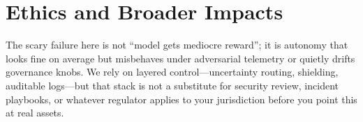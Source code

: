 \section{Ethics and Broader Impacts}

The scary failure here is not ``model gets mediocre reward''; it is autonomy that looks fine on average but misbehaves under adversarial telemetry or quietly drifts governance knobs. We rely on layered control---uncertainty routing, shielding, auditable logs---but that stack is not a substitute for security review, incident playbooks, or whatever regulator applies to your jurisdiction before you point this at real assets.
